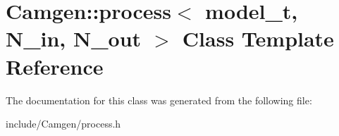 \hypertarget{a00429}{\section{Camgen\-:\-:process$<$ model\-\_\-t, N\-\_\-in, N\-\_\-out $>$ Class Template Reference}
\label{a00429}
}


The documentation for this class was generated from the following file\-:\begin{DoxyCompactItemize}
\item 
include/\-Camgen/process.\-h\end{DoxyCompactItemize}
